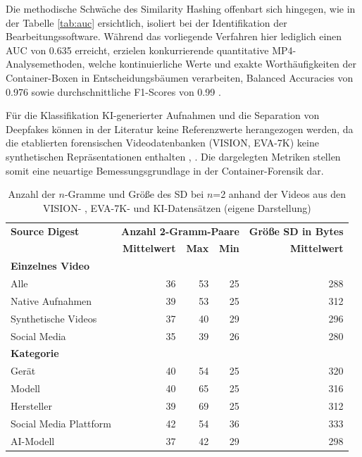 Die methodische Schwäche des Similarity Hashing offenbart sich hingegen, wie in der Tabelle \ref{tab:auc} ersichtlich, isoliert bei der Identifikation der Bearbeitungssoftware. Während das vorliegende Verfahren hier lediglich einen AUC von 0.635 erreicht, erzielen konkurrierende quantitative MP4-Analysemethoden, welche kontinuierliche Werte und exakte Worthäufigkeiten der Container-Boxen in Entscheidungsbäumen verarbeiten, Balanced Accuracies von 0.976 \cite[Kap. 4]{yang_efficient_2020} sowie durchschnittliche F1-Scores von 0.99 \cite[Kap. 5]{xiang_forensic_2021}.

Für die Klassifikation KI-generierter Aufnahmen und die Separation von Deepfakes können in der Literatur keine Referenzwerte herangezogen werden, da die etablierten forensischen Videodatenbanken (VISION, EVA-7K) keine synthetischen Repräsentationen enthalten \cite[Kap. 1]{shullani_vision_2017}, \cite[Kap. 1]{yang_efficient_2020}. Die dargelegten Metriken stellen somit eine neuartige Bemessungsgrundlage in der Container-Forensik dar.

\begin{table}[h]
    \centering
    \begin{tabular}{lrrrr}\toprule
  \textbf{Source Digest}&\multicolumn{3}{c}{\textbf{Anzahl 2-Gramm-Paare}}&\textbf{Größe SD in Bytes}\\
          &   \textbf{Mittelwert}& \textbf{Max}
&\textbf{Min}  &\textbf{Mittelwert}\\\midrule
 \multicolumn{5}{l}{\textbf{Einzelnes Video}}\\
  Alle& 36& 53& 25  &288
\\
          Native Aufnahmen&   39& 53&25&312
\\
          Synthetische Videos&   37& 40&29&296\\
          Social Media&   35& 39&26&280
\\\midrule
 \multicolumn{5}{l}{\textbf{Kategorie}}\\
 Gerät& 40& 54& 25
&320
\\
 Modell& 40& 65& 25
&316
\\
 Hersteller& 39& 69& 25
&312
\\
 Social Media Plattform& 42& 54& 36
&333
\\
 AI-Modell& 37& 42& 29
&298
\\ \bottomrule
    \end{tabular}
    \caption{Anzahl der \(n\)-Gramme und Größe des SD bei \(n\)=2 anhand der Videos aus den VISION- \cite{shullani_vision_2017}, EVA-7K- \cite{yang_efficient_2020} und KI-Datensätzen (eigene Darstellung)}
    \label{tab:anzahl}
\end{table}

